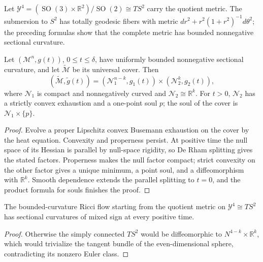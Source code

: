 Let
\(\mathcal Y^4=(\operatorname{SO}(3)\times\mathbb R^2)/\operatorname{SO}(2)
\cong TS^2\) carry the quotient metric.  The submersion to \(S^2\) has
totally geodesic fibers with metric
\(dr^2+r^2(1+r^2)^{-1}d\theta^2\); the preceding formulas show that the
complete metric has bounded nonnegative sectional curvature.

\begin{theorem}
\label{thm:chow-ii-persistent-nonnegative-sectional-splitting}
Let \((\mathcal M^n,g(t))\), \(0\leq t\leq\delta\), have uniformly bounded
nonnegative sectional curvature, and let \(\widetilde{\mathcal M}\) be its
universal cover.  Then
\[
 (\widetilde{\mathcal M},\widetilde g(t))
 =(\mathcal N_1^{n-k},g_1(t))\times(\mathcal N_2^k,g_2(t)),
\]
where \(\mathcal N_1\) is compact and nonnegatively curved and
\(\mathcal N_2\cong\mathbb R^k\).  For \(t>0\), \(\mathcal N_2\) has a
strictly convex exhaustion and a one-point soul \(p\); the soul of the cover
is \(\mathcal N_1\times\{p\}\).
\end{theorem}
\begin{proof}
Evolve a proper Lipschitz convex Busemann exhaustion on the cover by the heat
equation.  Convexity and properness persist.  At positive time the null space
of its Hessian is parallel by null-space rigidity, so De Rham splitting gives
the stated factors.  Properness makes the null factor compact; strict
convexity on the other factor gives a unique minimum, a point soul, and a
diffeomorphism with \(\mathbb R^k\).  Smooth dependence extends the parallel
splitting to \(t=0\), and the product formula for souls finishes the proof.
\end{proof}

\begin{corollary}
\label{cor:chow-ii-sectionally-nonnegative-quotient-counterexample}
The bounded-curvature Ricci flow starting from the quotient metric on
\(\mathcal Y^4\cong TS^2\) has sectional curvatures of mixed sign at every
positive time.
\end{corollary}
\begin{proof}
Otherwise the simply connected \(TS^2\) would be diffeomorphic to
\(N^{4-k}\times\mathbb R^k\), which would trivialize the tangent bundle of
the even-dimensional sphere, contradicting its nonzero Euler class.
\end{proof}

